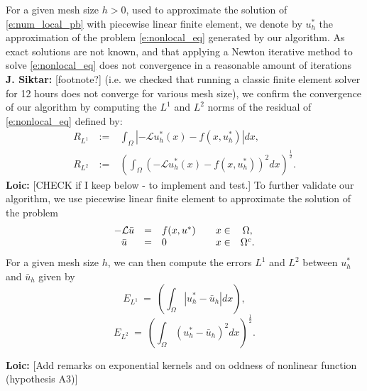 \documentclass[11pt]{amsart}   	%
\theoremstyle{plain}
\numberwithin{equation}{section}
\newcommand{\LC}[1]{{\color{purple} {\bf Loic:} [#1] }}
\newcommand{\JMS}[1]{{\color{orange} {\bf J. Siktar:} [#1] }}
\begin{document}
For a given mesh size $h > 0$, used to approximate the solution of \eqref{e:num_local_pb} with piecewise linear finite element, we denote by $u_h^*$ the approximation of the problem \eqref{e:nonlocal_eq} generated by our algorithm. As exact solutions are not known, and that applying a Newton iterative method to solve \eqref{e:nonlocal_eq} does not convergence in a reasonable amount of iterations \JMS{footnote?} (i.e. we checked that running a classic finite element solver for 12 hours does not converge for various mesh size), we confirm the convergence of our algorithm by computing the $L^1$ and $L^2$ norms of the residual of \eqref{e:nonlocal_eq} defined by:
$$
\begin{array}{lll}
  R_{L^1}   & \ := \ & \int_\Omega |-\mathcal{L} u_h^*(x) - f(x,u_h^*)| dx ,\\
  R_{L^2}   & \ := \ & \left( \int_\Omega (-\mathcal{L} u_h^*(x) - f(x,u_h^*))^2 dx \right)^{\frac{1}{2}} .
\end{array}
$$
\LC{CHECK if I keep below - to implement and test.} To further validate our algorithm, we use piecewise linear finite element to approximate the solution of the problem
\begin{equation}\label{e:linear_pb_cvg_old}
\begin{array}{c c l c c }
-\mathcal{L} \bar{u} & = &  f(x,u^*) & \quad  x \in & \Omega, \\
\bar{u}  & = &  0 & \quad x \in & \Omega^c.
\end{array}
\end{equation}
For a given mesh size $h$, we can then compute the errors $L^1$ and $L^2$ between $u_h^*$ and $\bar{u}_h$ given by
$$E_{L^1} \ = \ \left( \int_\Omega |u_h^* - \bar{u}_h | dx \right),$$
$$E_{L^2} \ = \ \left( \int_\Omega (u_h^* - \bar{u}_h )^2 dx \right)^{\frac{1}{2}}.$$

\LC{Add remarks on exponential kernels and on oddness of nonlinear function (hypothesis A3)}




\end{document}
